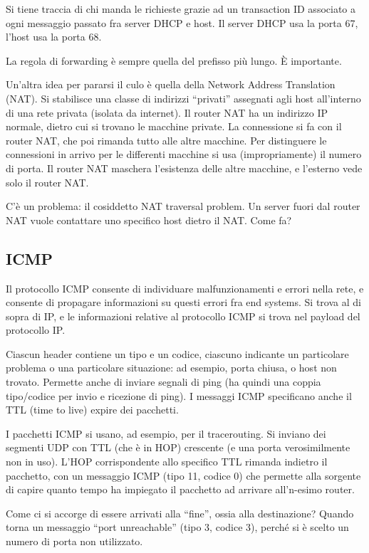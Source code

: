 Si tiene traccia di chi manda le richieste grazie ad un transaction ID associato a ogni messaggio passato fra server DHCP e host. Il server DHCP usa la porta 67, l'host usa la porta 68.

La regola di forwarding \`e sempre quella del prefisso pi\`u lungo. \`E importante.

Un'altra idea per pararsi il culo \`e quella della Network Address Translation (NAT). Si stabilisce una classe di indirizzi ``privati'' assegnati agli host all'interno di una rete privata (isolata da internet). Il router NAT ha un indirizzo IP normale, dietro cui si trovano le macchine private. La connessione si fa con il router NAT, che poi rimanda tutto alle altre macchine. Per distinguere le connessioni in arrivo per le differenti macchine si usa (impropriamente) il numero di porta. Il router NAT maschera l'esistenza delle altre macchine, e l'esterno vede solo il router NAT.

C'\`e un problema: il cosiddetto NAT traversal problem. Un server fuori dal router NAT vuole contattare uno specifico host dietro il NAT. Come fa? 

\subsection{ICMP}

Il protocollo ICMP consente di individuare malfunzionamenti e errori nella rete, e consente di propagare informazioni su questi errori fra end systems. Si trova al di sopra di IP, e le informazioni relative al protocollo ICMP si trova nel payload del protocollo IP.

Ciascun header contiene un tipo e un codice, ciascuno indicante un particolare problema o una particolare situazione: ad esempio, porta chiusa, o host non trovato. Permette anche di inviare segnali di ping (ha quindi una coppia tipo/codice per invio e ricezione di ping). I messaggi ICMP specificano anche il TTL (time to live) expire dei pacchetti.

I pacchetti ICMP si usano, ad esempio, per il tracerouting. Si inviano dei segmenti UDP con TTL (che \`e in HOP) crescente (e una porta verosimilmente non in uso). L'HOP corrispondente allo specifico TTL rimanda indietro il pacchetto, con un messaggio ICMP (tipo 11, codice 0) che permette alla sorgente di capire quanto tempo ha impiegato il pacchetto ad arrivare all'n-esimo router.

Come ci si accorge di essere arrivati alla ``fine'', ossia alla destinazione? Quando torna un messaggio ``port unreachable'' (tipo 3, codice 3), perch\'e si \`e scelto un numero di porta non utilizzato.

